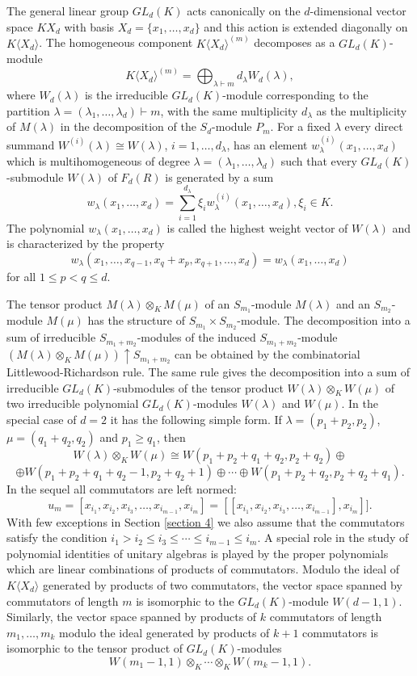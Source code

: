 \documentclass[12pt]{amsart}
\theoremstyle{definition}
\begin{document}
The general linear group $GL_d(K)$ acts canonically on the $d$-dimensional vector space $KX_d$ with basis $X_d=\{x_1,\ldots,x_d\}$
and this action is extended diagonally on $K\langle X_d\rangle$.
The homogeneous component $K\langle X_d\rangle^{(m)}$ decomposes as a $GL_d(K)$-module
\[
K\langle X_d\rangle^{(m)}=\bigoplus_{\lambda\vdash m}d_{\lambda}W_d(\lambda),
\]
where $W_d(\lambda)$ is the irreducible $GL_d(K)$-module corresponding to the partition $\lambda=(\lambda_1,\ldots,\lambda_d)\vdash m$,
with the same multiplicity $d_{\lambda}$ as the multiplicity of $M(\lambda)$ in the decomposition of the $S_d$-module $P_m$.
For a fixed $\lambda$ every direct summand $W^{(i)}(\lambda)\cong W(\lambda)$, $i=1,\ldots,d_{\lambda}$, has an element $w^{(i)}_{\lambda}(x_1,\ldots,x_d)$
which is multihomogeneous of degree $\lambda=(\lambda_1,\ldots,\lambda_d)$ such that
every $GL_d(K)$-submodule $W(\lambda)$ of $F_d(R)$ is generated by a sum
\[
w_{\lambda}(x_1,\ldots,x_d)=\sum_{i=1}^{d_{\lambda}}\xi_iw^{(i)}_{\lambda}(x_1,\ldots,x_d),\xi_i\in K.
\]
The polynomial $w_{\lambda}(x_1,\ldots,x_d)$ is called the highest weight vector of $W(\lambda)$ and is characterized by the property
\[
w_{\lambda}(x_1,\ldots,x_{q-1},x_q+x_p,x_{q+1},\ldots,x_d)=w_{\lambda}(x_1,\ldots,x_d)
\]
for all $1\leq p<q\leq d$.

The tensor product $M(\lambda)\otimes_K M(\mu)$ of an $S_{m_1}$-module $M(\lambda)$ and an $S_{m_2}$-module $M(\mu)$
has the structure of $S_{m_1}\times S_{m_2}$-module.
The decomposition into a sum of irreducible $S_{m_1+m_2}$-modules of the induced $S_{m_1+m_2}$-module $(M(\lambda)\otimes_K M(\mu))\uparrow S_{m_1+m_2}$
can be obtained by the combinatorial Littlewood-Richardson rule.
The same rule gives the decomposition into a sum of irreducible $GL_d(K)$-submodules
of the tensor product $W(\lambda)\otimes_K W(\mu)$ of two irreducible polynomial
$GL_d(K)$-modules $W(\lambda)$ and $W(\mu)$.
In the special case of $d=2$ it has the following simple form.
If $\lambda=(p_1+p_2,p_2)$, $\mu=(q_1+q_2,q_2)$ and $p_1\geq q_1$, then
\[
W(\lambda)\otimes_KW(\mu)\cong W(p_1+p_2+q_1+q_2,p_2+q_2)\oplus
\]
\[
\oplus W(p_1+p_2+q_1+q_2-1,p_2+q_2+1)\oplus\cdots\oplus W(p_1+p_2+q_2,p_2+q_2+q_1).
\]
In the sequel all commutators are left normed:
\[
u_m=[x_{i_1},x_{i_2},x_{i_3},\ldots,x_{i_{m-1}},x_{i_m}]=[[x_{i_1},x_{i_2},x_{i_3},\ldots,x_{i_{m-1}}],x_{i_m}]].
\]
With few exceptions in Section \ref{section 4} we also assume that the commutators satisfy the condition $i_1>i_2\leq i_3\leq\cdots\leq i_{m-1}\leq i_m$.
A special role in the study of polynomial identities of unitary algebras is played by the proper polynomials which are linear combinations of products of commutators.
Modulo the ideal of $K\langle X_d\rangle$ generated by products of two commutators, the vector space spanned by commutators of length $m$ is isomorphic to the $GL_d(K)$-module $W(d-1,1)$.
Similarly, the vector space spanned by products of $k$ commutators of length $m_1,\ldots,m_k$ modulo the ideal generated by products of $k+1$ commutators
is isomorphic to the tensor product of $GL_d(K)$-modules
\[
W(m_1-1,1)\otimes_K\cdots\otimes_KW(m_k-1,1).
\]
\end{document}
